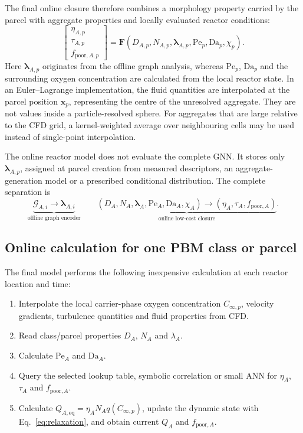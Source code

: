\documentclass[11pt,a4paper]{article}
\newcommand{\Pe}{\mathrm{Pe}}
\newcommand{\Da}{\mathrm{Da}}
\begin{document}
The final online closure therefore combines a morphology property carried by
the parcel with aggregate properties and locally evaluated reactor
conditions:
\begin{equation}
  \boxed{
  \begin{bmatrix}
  \eta_{A,p}\\[1mm]
  \tau_{A,p}\\[1mm]
  f_{\mathrm{poor},A,p}
  \end{bmatrix}
  =
  \boldsymbol F
  \left(
  D_{A,p},N_{A,p},\boldsymbol{\lambda}_{A,p},
  \Pe_p,\Da_p,\chi_p
  \right)}.
  \label{eq:online_closure_complete}
\end{equation}
Here \(\boldsymbol{\lambda}_{A,p}\) originates from the offline graph analysis,
whereas \(\Pe_p\), \(\Da_p\) and the surrounding oxygen concentration are
calculated from the local reactor state. In an Euler--Lagrange implementation,
the fluid quantities are interpolated at the parcel position
\(\boldsymbol{x}_p\), representing the centre of the unresolved aggregate.
They are not values inside a particle-resolved sphere. For aggregates that are
large relative to the CFD grid, a kernel-weighted average over neighbouring
cells may be used instead of single-point interpolation.

The online reactor model does not evaluate the complete GNN. It stores only
\(\boldsymbol{\lambda}_{A,p}\), assigned at parcel creation from measured
descriptors, an aggregate-generation model or a prescribed conditional
distribution. The complete separation is
\begin{equation}
  \underbrace{
  \mathcal{G}_{A,i}\longrightarrow
  \boldsymbol{\lambda}_{A,i}}
  _{\text{offline graph encoder}}
  \qquad
  \underbrace{
  (D_A,N_A,\boldsymbol{\lambda}_A,\Pe_A,\Da_A,\chi_A)
  \longrightarrow
  (\eta_A,\tau_A,f_{\mathrm{poor},A})}
  _{\text{online low-cost closure}}.
  \label{eq:offline_online_separation}
\end{equation}

\subsection{Online calculation for one PBM class or parcel}

The final model performs the following inexpensive calculation at each reactor
location and time:

\begin{enumerate}
  \item Interpolate the local carrier-phase oxygen concentration
  \(C_{\infty,p}\), velocity gradients, turbulence quantities and fluid
  properties from CFD.
  \item Read class/parcel properties \(D_A\), \(N_A\) and \(\lambda_A\).
  \item Calculate \(\Pe_A\) and \(\Da_A\).
  \item Query the selected lookup table, symbolic correlation or small ANN for
  \(\eta_A\), \(\tau_A\) and \(f_{\mathrm{poor},A}\).
  \item Calculate \(Q_{A,\mathrm{eq}}=\eta_A N_Aq(C_{\infty,p})\), update
  the dynamic state with Eq.~\eqref{eq:relaxation}, and obtain current
  \(Q_A\) and \(f_{\mathrm{poor},A}\).
\end{enumerate}
\end{document}
